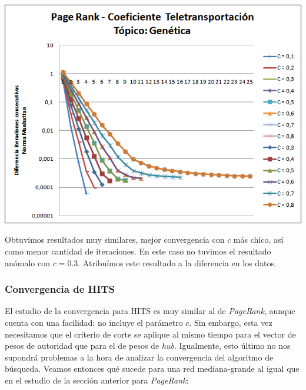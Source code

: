 	\par 
	\begin{center}
		\includegraphics[scale=0.6]{./img/page_rank_variacion_coef_teletransportacion_genetica.png}
	\end{center}
	\par 

	Obtuvimos resultados muy similares, mejor convergencia con $c$ más chico, así como menor cantidad de iteraciones. En este caso no tuvimos el resultado anómalo con $c=0.3$. Atribuímos este resultado a la diferencia en los datos.




\subsubsection{Convergencia de HITS}

El estudio de la convergencia para HITS es muy similar al de \textit{PageRank}, aunque cuenta con una facilidad: no incluye el parámetro $c$. Sin embargo, esta vez necesitamos que el criterio de corte se aplique al mismo tiempo para el vector de pesos de autoridad que para el de pesos de \textit{hub}. Igualmente, esto último no nos supondrá problemas a la hora de analizar la convergencia del algoritmo de búsqueda. Veamos entonces qué sucede para una red mediana-grande al igual que en el estudio de la sección anterior para \textit{PageRank}:
	
